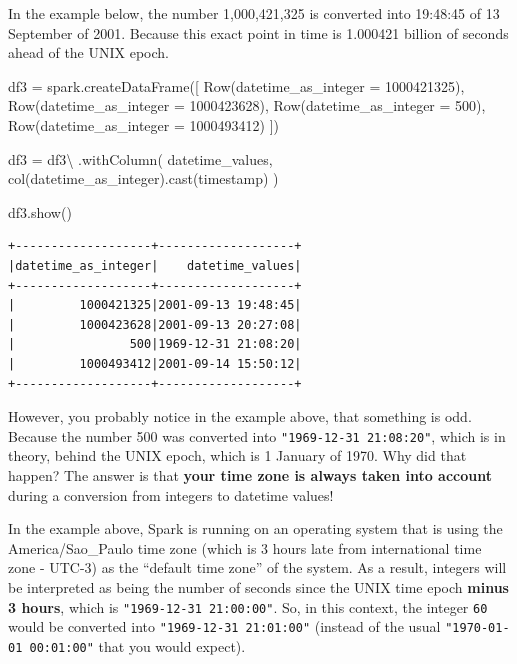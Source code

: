 \documentclass[
  11pt,
  letterpaper,
  DIV=11,
  numbers=noendperiod]{scrreprt}
\newenvironment{Shaded}{\begin{snugshade}}{\end{snugshade}}
\newcommand{\DecValTok}[1]{\textcolor[rgb]{0.68,0.00,0.00}{#1}}
\newcommand{\NormalTok}[1]{\textcolor[rgb]{0.00,0.23,0.31}{#1}}
\newcommand{\OperatorTok}[1]{\textcolor[rgb]{0.37,0.37,0.37}{#1}}
\newcommand{\StringTok}[1]{\textcolor[rgb]{0.13,0.47,0.30}{#1}}
\begin{document}
In the example below, the number 1,000,421,325 is converted into
19:48:45 of 13 September of 2001. Because this exact point in time is
1.000421 billion of seconds ahead of the UNIX epoch.

\begin{Shaded}
\begin{Highlighting}[]
\NormalTok{df3 }\OperatorTok{=}\NormalTok{ spark.createDataFrame([}
\NormalTok{    Row(datetime\_as\_integer }\OperatorTok{=} \DecValTok{1000421325}\NormalTok{),}
\NormalTok{    Row(datetime\_as\_integer }\OperatorTok{=} \DecValTok{1000423628}\NormalTok{),}
\NormalTok{    Row(datetime\_as\_integer }\OperatorTok{=} \DecValTok{500}\NormalTok{),}
\NormalTok{    Row(datetime\_as\_integer }\OperatorTok{=} \DecValTok{1000493412}\NormalTok{)}
\NormalTok{])}

\NormalTok{df3 }\OperatorTok{=}\NormalTok{ df3}\OperatorTok{\textbackslash{}}
\NormalTok{    .withColumn(}
        \StringTok{\textquotesingle{}datetime\_values\textquotesingle{}}\NormalTok{,}
\NormalTok{        col(}\StringTok{\textquotesingle{}datetime\_as\_integer\textquotesingle{}}\NormalTok{).cast(}\StringTok{\textquotesingle{}timestamp\textquotesingle{}}\NormalTok{)}
\NormalTok{    )}

\NormalTok{df3.show()}
\end{Highlighting}
\end{Shaded}

\begin{verbatim}
+-------------------+-------------------+
|datetime_as_integer|    datetime_values|
+-------------------+-------------------+
|         1000421325|2001-09-13 19:48:45|
|         1000423628|2001-09-13 20:27:08|
|                500|1969-12-31 21:08:20|
|         1000493412|2001-09-14 15:50:12|
+-------------------+-------------------+
\end{verbatim}

However, you probably notice in the example above, that something is
odd. Because the number 500 was converted into
\texttt{"1969-12-31\ 21:08:20"}, which is in theory, behind the UNIX
epoch, which is 1 January of 1970. Why did that happen? The answer is
that \textbf{your time zone is always taken into account} during a
conversion from integers to datetime values!

In the example above, Spark is running on an operating system that is
using the America/Sao\_Paulo time zone (which is 3 hours late from
international time zone - UTC-3) as the ``default time zone'' of the
system. As a result, integers will be interpreted as being the number of
seconds since the UNIX time epoch \textbf{minus 3 hours}, which is
\texttt{"1969-12-31\ 21:00:00"}. So, in this context, the integer
\texttt{60} would be converted into \texttt{"1969-12-31\ 21:01:00"}
(instead of the usual \texttt{"1970-01-01\ 00:01:00"} that you would
expect).
\end{document}
